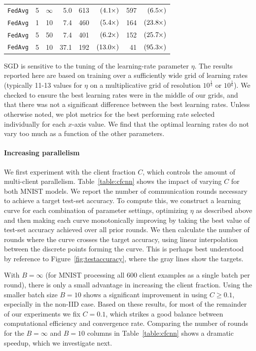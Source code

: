 \documentclass[twoside]{article}
\newcommand{\lbs}{\ensuremath{B}}      %
\newcommand{\all}{\infty}
\newcommand{\clientfrac}{\ensuremath{C}}    %
\newcommand{\xx}{\hspace{-0.01in}\ensuremath{\times}}
\newcommand{\algfont}[1]{\texttt{#1}}
\newcommand{\fedavgshort}{\algfont{FedAvg}\xspace}
\begin{document}
\begin{table}[t]
\begin{center}
{\begin{sc}
\begin{tabular}{rrrrr@{ }rr@{ }r}
\fedavgshort &    5 & $\infty$ &  5.0 &    613 & $(   4.1\xx)$ &    597 & $(   6.5\xx)$ \\
\fedavgshort &    1 &       10 &  7.4 &    460 & $(   5.4\xx)$ &    164 & $(  23.8\xx)$ \\
\fedavgshort &    5 &       50 &  7.4 &    401 & $(   6.2\xx)$ &    152 & $(  25.7\xx)$ \\
\fedavgshort &    5 &       10 & 37.1 &    192 & $(  13.0\xx)$ &     41 & $(  95.3\xx)$ \\  
\hline
\end{tabular}
\end{sc}
}
\end{center}
\end{table}

SGD is sensitive to the tuning of the learning-rate parameter
$\eta$. The results reported here are based on training
over a sufficiently wide grid of learning rates (typically 11-13
values for $\eta$ on a multiplicative grid of resolution
$10^{\frac{1}{3}}$ or $10^{\frac{1}{6}}$). We checked to ensure the
best learning rates were in the middle of our grids, and that there
was not a significant difference between the best learning rates.
Unless otherwise noted, we plot metrics for the best performing rate
selected individually for each $x$-axis value.  
We find that the optimal learning rates do not vary too
much as a function of the other parameters. 

\paragraph{Increasing parallelism} 
We first experiment with the client fraction $\clientfrac$, which controls
the amount of multi-client parallelism. Table~\ref{table:cfcnn} shows
the impact of varying $\clientfrac$ for both MNIST models.
We report the number of communication rounds necessary to achieve a
target test-set accuracy.  To compute this, we construct a learning
curve for each combination of parameter settings, optimizing $\eta$ as
described above and then making each curve monotonically improving by
taking the best value of test-set accuracy achieved over all prior
rounds. We then calculate the number of rounds where the curve crosses
the target accuracy, using linear interpolation between the discrete
points forming the curve.  This is perhaps best understood by
reference to Figure~\ref{fig:testaccuracy}, where the gray lines show
the targets.

With $\lbs=\all$ (for MNIST processing all 600 client examples as a
single batch per round), there is only a small advantage in increasing
the client fraction. Using the smaller batch size $\lbs=10$ shows a
significant improvement in using $\clientfrac \ge 0.1$, especially in
the non-IID case. Based on these results, for most of the remainder of
our experiments we fix $\clientfrac = 0.1$, which strikes a good
balance between computational efficiency and convergence
rate. Comparing the number of rounds for the $\lbs=\all$ and $\lbs=10$
columns in Table~\ref{table:cfcnn} shows a dramatic speedup, which we
investigate next.
\end{document}

